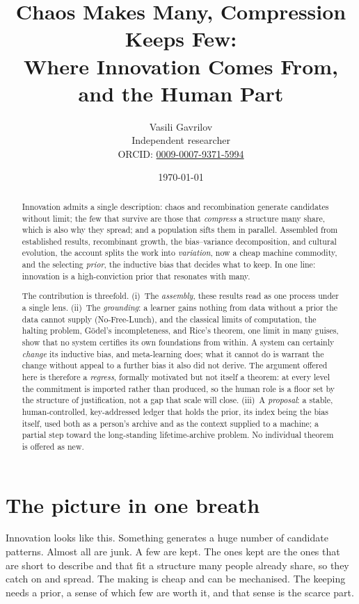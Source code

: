 \documentclass[11pt]{article}
\title{Chaos Makes Many, Compression Keeps Few:\\
Where Innovation Comes From, and the Human Part}
\author{Vasili Gavrilov\\
\small Independent researcher\\
\small ORCID: \href{https://orcid.org/0009-0007-9371-5994}{0009-0007-9371-5994}}
\date{\today}
\begin{document}
\maketitle

\begin{abstract}
Innovation admits a single description: chaos and recombination generate candidates without limit;
the few that survive are those that \emph{compress} a structure many share, which is also why they
spread; and a population sifts them in parallel. Assembled from established results, recombinant
growth, the bias--variance decomposition, and cultural evolution, the account splits the work into
\emph{variation}, now a cheap machine commodity, and the selecting \emph{prior}, the inductive bias
that decides what to keep. In one line: innovation is a high-conviction prior that resonates with
many.

The contribution is threefold. (i)~The \emph{assembly}, these results read as one process under a
single lens. (ii)~The \emph{grounding}: a learner gains nothing from data without a prior the data cannot supply
(No-Free-Lunch), and the classical limits of computation, the halting problem, G\"odel's
incompleteness, and Rice's theorem, one limit in many guises, show that no system certifies its own
foundations from within. A system can certainly \emph{change} its inductive bias, and meta-learning
does; what it cannot do is warrant the change without appeal to a further bias it also did not derive.
The argument offered here is therefore a \emph{regress}, formally motivated but not itself a theorem:
at every level the commitment is imported rather than produced, so the human role is a floor set by
the structure of justification, not a gap that scale will close. (iii)~A \emph{proposal}: a stable, human-controlled, key-addressed
ledger that holds the prior, its index being the bias itself, used both as a person's archive and as
the context supplied to a machine; a partial step toward the long-standing lifetime-archive problem. No individual theorem is offered as new.
\end{abstract}

\section{The picture in one breath}
Innovation looks like this. Something generates a huge number of candidate patterns. Almost all are
junk. A few are kept. The ones kept are the ones that are short to describe and that fit a structure
many people already share, so they catch on and spread. The making is cheap and can be mechanised.
The keeping needs a prior, a sense of which few are worth it, and that sense is the scarce part.
\end{document}
